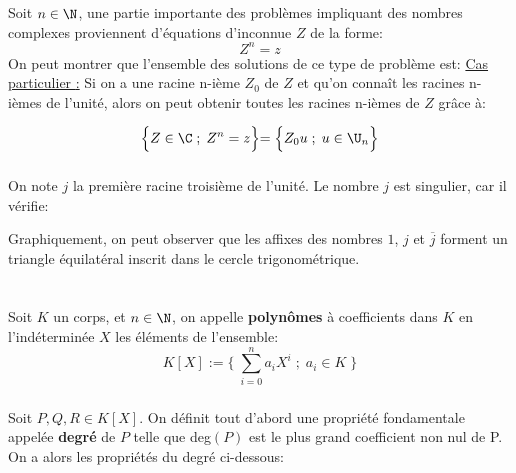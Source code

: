 \subsection*{}
Soit \(n \in \N\), une partie importante des problèmes impliquant des nombres complexes proviennent d'équations d'inconnue \(Z\) de la forme:
\[
   Z^n = z
\]
On peut montrer que l'ensemble des solutions de ce type de problème est:
\underline{Cas particulier {:}}
Si on a une racine n-ième \(Z_0\) de \(Z\) et qu'on connaît les racines n-ièmes de l'unité, alors on peut obtenir toutes les racines n-ièmes de \(Z\) grâce à:

\[
   \Bigl\{ Z \in \C \; ; \; Z^n = z \Bigl\} = \Bigl\{ Z_0u \; ; \; u \in \U_n \Bigl\}   
\]

\subsection*{}
On note \(j\) la première racine troisième de l'unité.
Le nombre \(j\) est singulier, car il vérifie:

Graphiquement, on peut observer que les affixes des nombres \(1\), \(j\) et \(\overline{j}\) forment un triangle équilatéral inscrit dans le cercle trigonométrique.
\chapter*{} %

\subsection*{}
Soit \(K\) un corps, et \(n \in \N\), on appelle \textbf{polynômes} à coefficients dans \(K\) en l'indéterminée \(X\) les éléments de l'ensemble:
\[
   K[X] := \Biggl\{ \; \sum_{i=0}^n a_{i}X^{i} \; ; \; a_i \in K \;\Biggl\}
\]

\subsection*{}
Soit \(P, Q, R \in K[X]\).\+
On définit tout d'abord une propriété fondamentale appelée \textbf{degré} de \(P\) telle que deg\((P)\) est le plus grand coefficient non nul de P.
On a alors les propriétés du degré ci-dessous:

